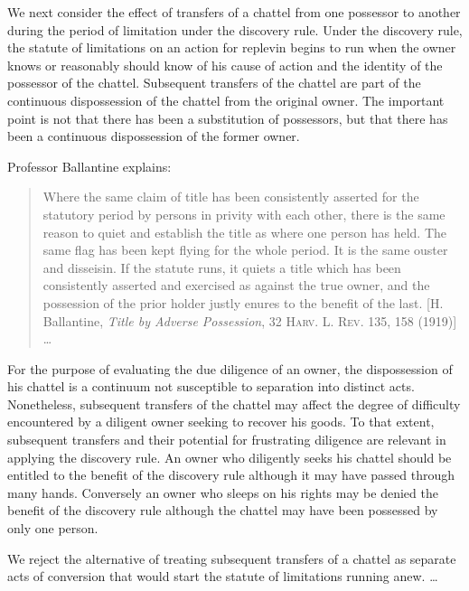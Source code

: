 
We next consider the effect of transfers of a chattel from one possessor to
another during the period of limitation under the discovery rule. Under the
discovery rule, the statute of limitations on an action for replevin begins to
run when the owner knows or reasonably should know of his cause of action and
the identity of the possessor of the chattel. Subsequent transfers of the
chattel are part of the continuous dispossession of the chattel from the
original owner. The important point is not that there has been a substitution
of possessors, but that there has been a continuous dispossession of the former
owner.

Professor Ballantine explains:
\begin{quote}
Where the same claim of title has been consistently asserted for the statutory
period by persons in privity with each other, there is the same reason to quiet
and establish the title as where one person has held. The same flag has been
kept flying for the whole period. It is the same ouster and disseisin. If the
statute runs, it quiets a title which has been consistently asserted and
exercised as against the true owner, and the possession of the prior holder
justly enures to the benefit of the last. [H. Ballantine, \textit{Title by
Adverse Possession}, 32 \textsc{Harv. L. Rev}. 135, 158 (1919)] \ldots
\end{quote}
For the purpose of evaluating the due diligence of an owner, the dispossession
of his chattel is a continuum not susceptible to separation into distinct acts.
Nonetheless, subsequent transfers of the chattel may affect the degree of
difficulty encountered by a diligent owner seeking to recover his goods. To
that extent, subsequent transfers and their potential for frustrating diligence
are relevant in applying the discovery rule. An owner who diligently seeks his
chattel should be entitled to the benefit of the discovery rule although it may
have passed through many hands. Conversely an owner who sleeps on his rights
may be denied the benefit of the discovery rule although the chattel may have
been possessed by only one person.

We reject the alternative of treating subsequent transfers of a chattel as
separate acts of conversion that would start the statute of limitations running
anew.  \ldots

